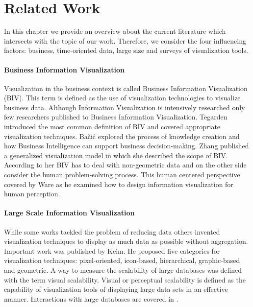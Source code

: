 \chapter{Related Work}
\label{chap:related Work}
In this chapter we provide an overview about the current literature which intersects with the topic of our work. Therefore, we consider the four influencing factors: business, time-oriented data, large size and surveys of visualization tools. 

\subsubsection*{Business Information Visualization} 
Visualization in the business context is called Business Information Visualization (BIV). This term is defined as the use of visualization technologies to visualize business data\cite{Tegarden1999}. Although Information Visualization is intensively researched\cite{Shneiderman2008,Shneiderman2002,Shneiderman1996,Keim2002} only few researchers published to Business Information Visualization.  Tegarden\cite{Tegarden1999} introduced the most common definition of BIV and covered appropriate visualization techniques. Bačić explored the process of knowledge creation\cite{Bacic2012} and how Business Intelligence can support business decision-making\cite{Bacic,Bacic2012}.  Zhang\cite{Zhang,Zhang1998,Zhang2001} published a generalized visualization model in which she described the scope of BIV. According to her BIV has to deal with non-geometric data and on the other side consider the human problem-solving process. This human centered perspective covered by Ware\cite{Ware2012a} as he examined how to design information visualization for human perception.

\subsubsection*{Large Scale Information Visualization}
While some works tackled the problem of reducing data others invented visualization techniques to display as much data as possible without aggregation\cite{Krzywinski2009,Luo2012,Fekete2002}. Important work was published by Keim\cite{Keim1996}. He proposed five categories for visualization techniques: pixel-oriented\cite{Keim1995,Stein2013,Keim2000,keim1996pixel,Keim2001, Keim2005,Keim2008VisualChallenges}, icon-based\cite{Chung2014,Borgo2013,Fanea2005}, hierarchical\cite{Yang2003,Shneiderman1992,LeBlanc1990}, graphic-based and geometric\cite{Noirhomme-Fraiture2002}.
A way to measure the scalability of large databases was defined with the term visual scalability. Visual or perceptual scalability is defined as the capability of visualization tools of displaying large data sets in an effective manner\cite{Eick2002}.
Interactions with large databases are covered in \cite{Fisher2012,Buono,Jerding1998,mackinlay1991perspective,Keim2005}. 

